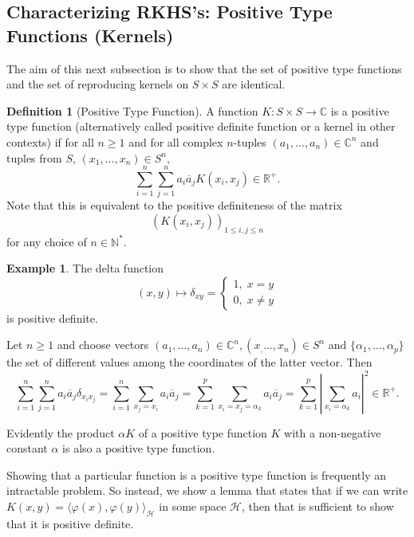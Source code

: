 \documentclass[psamsfonts]{amsart}
\theoremstyle{definition}
\newtheorem{exmp}[thm]{Example}
\newtheorem{defn}[thm]{Definition}
\theoremstyle{remark}
\numberwithin{equation}{section}
\begin{document}
\subsection{Characterizing RKHS's: Positive Type Functions (Kernels)}
The aim of this next subsection is to show that the set of positive type functions and the set of reproducing kernels on $S \times S$ are identical. 
\begin{defn}[Positive Type Function]
A function $K: S \times S \rightarrow \mathbb{C}$ is a positive type function (alternatively called positive definite function or a kernel in other contexts) if for all $n \geq 1$ and for all complex $n$-tuples $(a_1, \dots , a_n) \in \mathbb{C}^n$ and tuples from $S$, $(x_1, \dots , x_n) \in S^n$, 
$$\sum ^n _{i = 1} \sum _{j = 1} ^n a_i \overline{a}_j K(x_i, x_j) \in \mathbb{R}^+.$$
Note that this is equivalent to the positive definiteness of the matrix 
$$(K(x_i, x_j))_{1 \leq i, j \leq n} $$
for any choice of $n \in \mathbb{N}^*$. 
\end{defn}

\begin{exmp} The delta function 
$$(x, y) \mapsto \delta _{xy}  = \begin{cases} 1, \;  x=y \\ 0, \;  x \neq y \end{cases} $$
is positive definite. 

Let $n \geq 1$ and choose vectors $(a_1, \dots , a_n) \in \mathbb{C}^n, (x_, \dots , x_n) \in S^n$ and $\{ \alpha _1, \dots , \alpha _p \}$ the set of different values among the coordinates of the latter vector. Then 
$$\sum ^n _{i =1} \sum ^n _{j =1} a_i \overline{a}_j \delta_{x_ix_j} = \sum ^n _{i =1} \sum _{x_j = x_i} a_i \overline{a}_j = \sum ^p _{k =1} \sum _{x_i = x_j = \alpha _k} a_i \overline{a}_j = \sum ^p _{k =1} \left| \sum _{x_i = \alpha _k} a_i\right| ^2 \in \mathbb{R}^+ .$$

Evidently the product $\alpha K$ of a positive type function $K$ with a non-negative constant $\alpha$ is also a positive type function. 

\end{exmp}

Showing that a particular function is a positive type function is frequently an intractable problem. So instead, we show a lemma that states that if we can write $K(x,y) = \langle \varphi (x), \varphi (y) \rangle_{\mathcal{H}}$ in some space $\mathcal{H}$, then that is sufficient to show that it is positive definite. 
\end{document}
